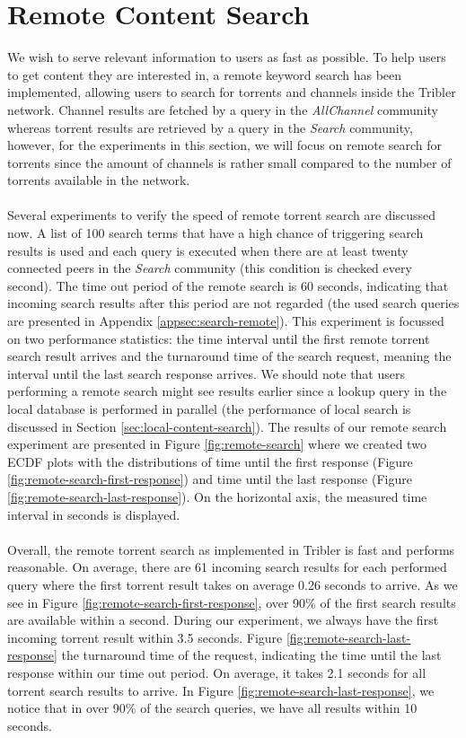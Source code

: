 \section{Remote Content Search}
\label{sec:remote-content-search-experiment}
We wish to serve relevant information to users as fast as possible. To help users to get content they are interested in, a remote keyword search has been implemented, allowing users to search for torrents and channels inside the Tribler network. Channel results are fetched by a query in the \emph{AllChannel} community whereas torrent results are retrieved by a query in the \emph{Search} community, however, for the experiments in this section, we will focus on remote search for torrents since the amount of channels is rather small compared to the number of torrents available in the network.\\\\
Several experiments to verify the speed of remote torrent search are discussed now. A list of 100 search terms that have a high chance of triggering search results is used and each query is executed when there are at least twenty connected peers in the \emph{Search} community (this condition is checked every second). The time out period of the remote search is 60 seconds, indicating that incoming search results after this period are not regarded (the used search queries are presented in Appendix \ref{appsec:search-remote}). This experiment is focussed on two performance statistics: the time interval until the first remote torrent search result arrives and the turnaround time of the search request, meaning the interval until the last search response arrives. We should note that users performing a remote search might see results earlier since a lookup query in the local database is performed in parallel (the performance of local search is discussed in Section \ref{sec:local-content-search}). The results of our remote search experiment are presented in Figure \ref{fig:remote-search} where we created two ECDF plots with the distributions of time until the first response (Figure \ref{fig:remote-search-first-response}) and time until the last response (Figure \ref{fig:remote-search-last-response}). On the horizontal axis, the measured time interval in seconds is displayed.\\\\
Overall, the remote torrent search as implemented in Tribler is fast and performs reasonable. On average, there are 61 incoming search results for each performed query where the first torrent result takes on average 0.26 seconds to arrive. As we see in Figure \ref{fig:remote-search-first-response}, over 90\% of the first search results are available within a second. During our experiment, we always have the first incoming torrent result within 3.5 seconds. Figure \ref{fig:remote-search-last-response} the turnaround time of the request, indicating the time until the last response within our time out period. On average, it takes 2.1 seconds for all torrent search results to arrive. In Figure \ref{fig:remote-search-last-response}, we notice that in over 90\% of the search queries, we have all results within 10 seconds.\\

